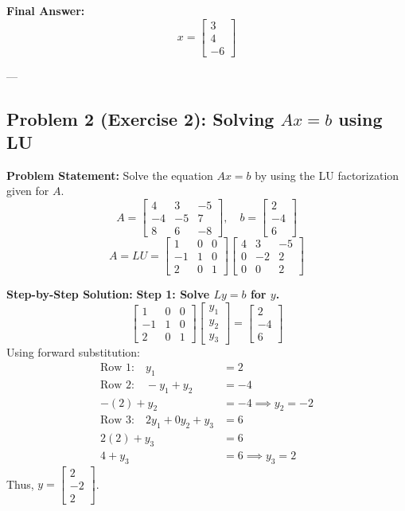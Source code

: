 \documentclass[11pt]{article}
\begin{document}
\textbf{Final Answer:}
\[ x = \begin{bmatrix} 3 \\ 4 \\ -6 \end{bmatrix} \]

---

\subsection{Problem 2 (Exercise 2): Solving $Ax=b$ using LU}
\textbf{Problem Statement:} Solve the equation $Ax = b$ by using the LU factorization given for $A$.
\[ A = \begin{bmatrix} 4 & 3 & -5 \\ -4 & -5 & 7 \\ 8 & 6 & -8 \end{bmatrix}, \quad b = \begin{bmatrix} 2 \\ -4 \\ 6 \end{bmatrix} \]
\[ A = LU = \begin{bmatrix} 1 & 0 & 0 \\ -1 & 1 & 0 \\ 2 & 0 & 1 \end{bmatrix} \begin{bmatrix} 4 & 3 & -5 \\ 0 & -2 & 2 \\ 0 & 0 & 2 \end{bmatrix} \]

\textbf{Step-by-Step Solution:}
\textbf{Step 1: Solve $Ly = b$ for $y$.}
\[ \begin{bmatrix} 1 & 0 & 0 \\ -1 & 1 & 0 \\ 2 & 0 & 1 \end{bmatrix} \begin{bmatrix} y_1 \\ y_2 \\ y_3 \end{bmatrix} = \begin{bmatrix} 2 \\ -4 \\ 6 \end{bmatrix} \]
Using forward substitution:
\begin{align*}
    \text{Row 1:} \quad y_1 &= 2 \\
    \text{Row 2:} \quad -y_1 + y_2 &= -4 \\
    -(2) + y_2 &= -4 \implies y_2 = -2 \\
    \text{Row 3:} \quad 2y_1 + 0y_2 + y_3 &= 6 \\
    2(2) + y_3 &= 6 \\
    4 + y_3 &= 6 \implies y_3 = 2
\end{align*}
Thus, $y = \begin{bmatrix} 2 \\ -2 \\ 2 \end{bmatrix}$.
\end{document}
